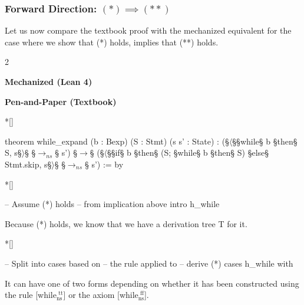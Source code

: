 \subsubsection*{Forward Direction: $(*) \implies (**)$}
Let us now compare the textbook proof with the mechanized equivalent for the case where we show that (*) holds, implies that (**) holds.
\newpage
\begin{paracol}{2}
\begin{leftcolumn}
    \centering \textbf{Mechanized (Lean 4)}
\end{leftcolumn}
\begin{rightcolumn}
    \centering \textbf{Pen-and-Paper (Textbook)} \\\noindent
\end{rightcolumn}

\switchcolumn[1]*[]
\begin{leftcolumn}
    \begin{Lean_Code}
theorem while_expand
  (b : Bexp)
  (S : Stmt)
  (s s' : State) :
  (§\(\langle\)§§while§ b §then§ S, s§\(\rangle\)§ §\(\to_{ns}\)§ s')
  §\(\to\)§ (§\(\langle\)§§if§ b
    §then§ (S; §while§ b §then§ S)
    §else§ Stmt.skip, s§\(\rangle\)§ §\(\to_{ns}\)§ s')
  := by
    \end{Lean_Code}
\end{leftcolumn}
\begin{rightcolumn}
\end{rightcolumn}
\switchcolumn[1]*[]
\begin{leftcolumn}
    \begin{Lean_Code}
  -- Assume (*) holds
  -- from implication above
  intro h_while
    \end{Lean_Code}
\end{leftcolumn}
\begin{rightcolumn} \noindent
Because (*) holds, we know that we have a derivation tree T for it.
\end{rightcolumn}
\switchcolumn[1]*[]
\begin{leftcolumn}
    \begin{Lean_Code}
  -- Split into cases based on
  -- the rule applied to
  -- derive (*)
  cases h_while with
    \end{Lean_Code}
\end{leftcolumn}
\begin{rightcolumn} \noindent
It can have one of two forms depending on whether it has been constructed using the
rule [while$_{\text{ns}}^{\text{\ tt}}$] or the axiom [while$_{\text{ns}}^{\text{\ ff}}$].

\end{rightcolumn}
\end{paracol}

